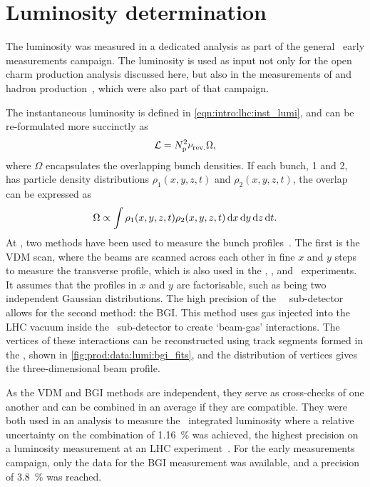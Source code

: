 \section{Luminosity determination}
\label{chap:prod:data:lumi}

The luminosity was measured in a dedicated analysis as part of the general 
\lhcb\ early measurements campaign.
The luminosity is used as input not only for the open charm production analysis 
discussed here, but also in the measurements of \PJpsi and \PB hadron 
production~\cite{LHCb-PAPER-2015-037,LHCb-PAPER-2016-031}, which were also part 
of that campaign.

The instantaneous luminosity is defined in \cref{eqn:intro:lhc:inst_lumi}, and 
can be re-formulated more succinctly as
\begin{equation}
  \mathcal{L} = N_{\text{p}}^{2}\nu_{\textnormal{rev.}}\Omega,
  \label{eqn:prod:data:lumi}
\end{equation}
where $\Omega$ encapsulates the overlapping bunch densities.
If each bunch, 1 and 2, has particle density distributions $\rho_{1}(x, y, z, 
t)$ and $\rho_{2}(x, y, z, t)$, the overlap can be expressed as
\begin{equation}
  \Omega \propto \int \rho_{1}(x, y, z, t)\rho_{2}(x, y, z, t)
                      \mathop{}\!\textnormal{d}{x}\mathop{}\!\textnormal{d}{y}\mathop{}\!\textnormal{d}{z}\mathop{}\!\textnormal{d}{t}.
  \label{eqn:prod:data:lumi:profile}
\end{equation}
At \lhcb, two methods have been used to measure the bunch 
profiles~\cite{LHCb-PAPER-2014-047}.
The first is the \ac{VDM} scan, where the beams are scanned across each other 
in fine $x$ and $y$ steps to measure the transverse profile, which is also used 
in the \atlas, \cms, and \alice\ experiments.
It assumes that the profiles in $x$ and $y$ are factorisable, such as being two 
independent Gaussian distributions.
The high precision of the \lhcb\ \velo\ sub-detector allows for the second 
method: the \ac{BGI}.
This method uses gas injected into the \ac{LHC} vacuum inside the \velo\ 
sub-detector to create `beam-gas' interactions.
The vertices of these interactions can be reconstructed using track segments 
formed in the \velo, shown in \cref{fig:prod:data:lumi:bgi_fits}, and the 
distribution of vertices gives the three-dimensional beam profile.

As the \ac{VDM} and \ac{BGI} methods are independent, they serve as 
cross-checks of one another and can be combined in an average if they are 
compatible.
They were both used in an analysis to measure the \runone\ integrated 
luminosity where a relative uncertainty on the combination of 
\SI{1.16}{\percent} was achieved, the highest precision on a luminosity 
measurement at an \ac{LHC} experiment~\cite{LHCb-PAPER-2014-047}.
For the early measurements campaign, only the data for the \ac{BGI} measurement 
was available, and a precision of \SI{3.8}{\percent} was reached.

